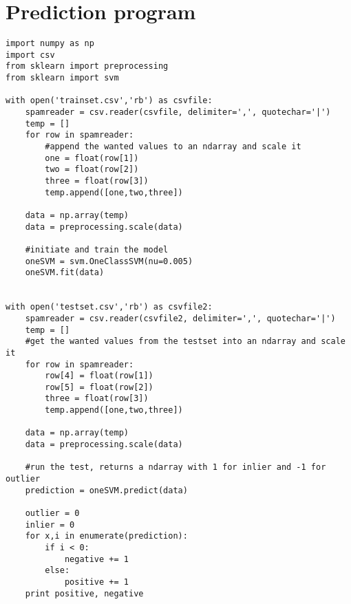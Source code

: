 \chapter{Prediction program}
\label{chp:predprogam}

\begin{Verbatim}
import numpy as np
import csv
from sklearn import preprocessing
from sklearn import svm

with open('trainset.csv','rb') as csvfile:
	spamreader = csv.reader(csvfile, delimiter=',', quotechar='|')
	temp = []
	for row in spamreader:
		#append the wanted values to an ndarray and scale it
		one = float(row[1])
		two = float(row[2])
		three = float(row[3])
		temp.append([one,two,three])

	data = np.array(temp)
	data = preprocessing.scale(data)
	
	#initiate and train the model
	oneSVM = svm.OneClassSVM(nu=0.005)
	oneSVM.fit(data)


with open('testset.csv','rb') as csvfile2:
	spamreader = csv.reader(csvfile2, delimiter=',', quotechar='|')
	temp = []
	#get the wanted values from the testset into an ndarray and scale it
	for row in spamreader:
		row[4] = float(row[1])
		row[5] = float(row[2])
		three = float(row[3])
		temp.append([one,two,three])

	data = np.array(temp)
	data = preprocessing.scale(data)

	#run the test, returns a ndarray with 1 for inlier and -1 for outlier
	prediction = oneSVM.predict(data)
	
	outlier = 0
	inlier = 0
	for x,i in enumerate(prediction):
		if i < 0:
			negative += 1
		else:
			positive += 1
	print positive, negative
\end{Verbatim}